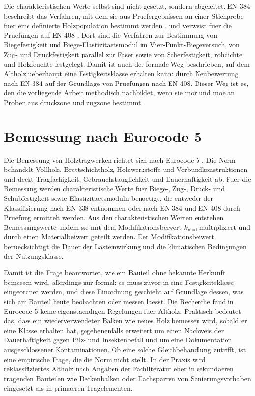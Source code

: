 Die charakteristischen Werte selbst sind nicht gesetzt, sondern abgeleitet.
EN 384 beschreibt das Verfahren, mit dem sie aus Pruefergebnissen an einer
Stichprobe fuer eine definierte Holzpopulation bestimmt werden
\parencite{en384}, und verweist fuer die Pruefungen auf EN 408
\parencite{en408}. Dort sind die Verfahren zur Bestimmung von
Biegefestigkeit und Biege-Elastizitaetsmodul im Vier-Punkt-Biegeversuch,
von Zug- und Druckfestigkeit parallel zur Faser sowie von Scherfestigkeit,
\gls{rohdichte} und Holzfeuchte festgelegt. Damit ist auch der formale Weg
beschrieben, auf dem Altholz ueberhaupt eine Festigkeitsklasse erhalten kann:
durch Neubewertung nach EN 384 auf der Grundlage von Pruefungen nach EN 408.
Dieser Weg ist es, den die vorliegende Arbeit methodisch nachbildet, wenn sie
\acrshort{mor} und \acrshort{moe} an Proben aus \gls{druckzone} und
\gls{zugzone} bestimmt.

\section{Bemessung nach Eurocode 5}
\label{sec:ec5}

Die Bemessung von Holztragwerken richtet sich nach Eurocode 5
\parencite{ec5}. Die Norm behandelt Vollholz, Brettschichtholz,
Holzwerkstoffe und Verbundkonstruktionen und deckt Tragfaehigkeit,
Gebrauchstauglichkeit und Dauerhaftigkeit ab. Fuer die Bemessung werden
charakteristische Werte fuer Biege-, Zug-, Druck- und Schubfestigkeit sowie
Elastizitaetsmoduln benoetigt, die entweder der Klassifizierung nach EN 338
entnommen oder nach EN 384 und EN 408 durch Pruefung ermittelt werden. Aus den
charakteristischen Werten entstehen Bemessungswerte, indem sie mit dem
Modifikationsbeiwert $k_{\mathrm{mod}}$ multipliziert und durch einen
Materialbeiwert geteilt werden. Der Modifikationsbeiwert beruecksichtigt die
Dauer der Lasteinwirkung und die klimatischen Bedingungen der
Nutzungsklasse.

Damit ist die Frage beantwortet, wie ein Bauteil ohne bekannte Herkunft
bemessen wird, allerdings nur formal: es muss zuvor in eine Festigkeitsklasse
eingeordnet werden, und diese Einordnung geschieht auf Grundlage dessen, was
sich am Bauteil heute beobachten oder messen laesst. Die Recherche fand in
Eurocode 5 keine eigenstaendigen Regelungen fuer Altholz. Praktisch bedeutet
das, dass ein wiederverwendeter Balken wie neues Holz bemessen wird, sobald er
eine Klasse erhalten hat, gegebenenfalls erweitert um einen Nachweis der
Dauerhaftigkeit gegen Pilz- und Insektenbefall und um eine Dokumentation
ausgeschlossener Kontaminationen. Ob eine solche Gleichbehandlung zutrifft,
ist eine empirische Frage, die die Norm nicht stellt. In der Praxis wird
reklassifiziertes Altholz nach Angaben der Fachliteratur eher in sekundaeren
tragenden Bauteilen wie Deckenbalken oder Dachsparren von
Sanierungsvorhaben eingesetzt als in primaeren Tragelementen.

